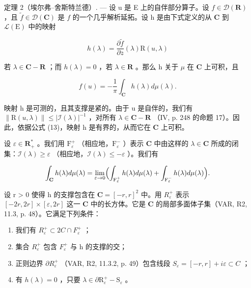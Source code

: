 定理 2（埃尔弗--舍斯特兰德）. --- 设 u 是 E 上的自伴部分算子。设 \(f \in \mathcal{D}(\mathbf{R})\) ，且 \(\widetilde{f} \in \mathcal{D}(\mathbf{C})\) 是 \(f\) 的一个几乎解析延拓。设 h 是由下式定义的从 \(\mathbf{C}\) 到 \(\mathcal{L}(\mathrm{E})\) 中的映射

\[
h (\lambda) = \frac {\partial \widetilde {f}}{\partial \overline {{z}}} (\lambda) \mathrm{R} (u, \lambda)
\]

若 \(\lambda\in\mathbf{C} - \mathbf{R}\) ；而 \(h(\lambda)=0\) ，若 \(\lambda\in\mathbf{R}\) 。那么 h 关于 \(\mu\) 在 \(\mathbf{C}\) 上可积，且

\[
f (u) = - \frac {1}{\pi} \int_ {\mathbf {C}} h (\lambda) d \mu (\lambda).
\]

映射 h 是可测的，且其支撑是紧的。由于 u 是自伴的，我们有 \(\|\mathrm{R}(u,\lambda)\| \leqslant |\mathcal{I}(\lambda)|^{-1}\) ，对所有 \(\lambda \in \mathbf{C} - \mathbf{R}\) （IV, p. 248 的命题 17）。因此，依据公式 (13)，映射 h 是有界的，从而它在 \(\mathbf{C}\) 上可积。

设 \(\varepsilon \in \mathbf{R}_{+}^{*}\) 。我们用 \(\mathrm{F}_{\varepsilon}^{+}\) （相应地，\(\mathrm{F}_{\varepsilon}^{-}\) ）表示 \(\mathbf{C}\) 中由这样的 \(\lambda \in \mathbf{C}\) 所成的闭集：\(\mathcal{I}(\lambda) \geqslant \varepsilon\) （相应地，\(\mathcal{I}(\lambda) \leqslant -\varepsilon\) ）。我们有

\[
\int_ {\mathbf {C}} h (\lambda) d \mu (\lambda) = \lim _ {\varepsilon \to 0} \Bigl (\int_ {\mathrm{F} _ {\varepsilon} ^ {+}} h (\lambda) d \mu (\lambda) + \int_ {\mathrm{F} _ {\varepsilon} ^ {-}} h (\lambda) d \mu (\lambda) \Bigr).
\]

设 r > 0 使得 h 的支撑包含在 \(\mathbf{C} = [-r, r]^{2}\) 中。用 \(R_{\varepsilon}^{+}\) 表示 \([-2r, 2r] \times [\varepsilon, 2r]\) 这一 \(\mathbf{C}\) 中的长方体。它是 \(\mathbf{C}\) 的局部多面体子集（VAR, R2, 11.3, p. 48）。它满足下列条件：

\begin{enumerate}
\def\labelenumi{(\roman{enumi})}
\item
  我们有 \(R_{\varepsilon}^{+} \subset 2C \cap F_{\varepsilon}^{+}\) ；
\item
  集合 \(R_{\varepsilon}^{+}\) 包含 \(F_{\varepsilon}^{+}\) 与 h 的支撑的交；
\item
  正则边界 \(\partial R_{\varepsilon}^{+}\) （VAR, R2, 11.3.2, p. 49）包含线段 \(S_{\varepsilon} = [-r, r] + i\varepsilon \subset C\) ；
\item
  有 \(h(\lambda) = 0\) ，只要 \(\lambda \in \partial \mathrm{R}_{\varepsilon}^{+} - \mathrm{S}_{\varepsilon}\) 。
\end{enumerate}

